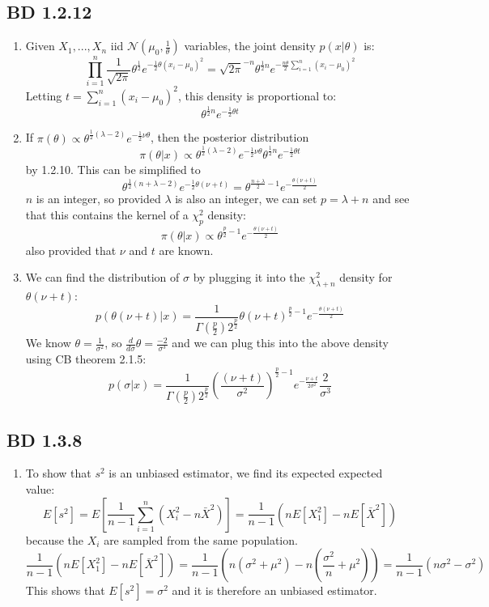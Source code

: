 \documentclass[a4paper,12pt]{article}
\begin{document}
\subsection{BD 1.2.12}
\begin{enumerate}
  \item Given $X_1,...,X_n$ iid $\mathcal{N}(\mu_0,\frac{1}{\theta})$ variables, the joint density $p(x|\theta)$ is:
  $$\prod_{i=1}^n \frac{1}{\sqrt{2\pi}}\theta^{\frac{1}{2}}e^{-\frac{1}{2}\theta(x_i-\mu_0)^2}=\sqrt{2\pi}^{-n} \theta^{\frac{1}{2}n}e^{-\frac{n\theta}{2}\sum_{i=1}^n(x_i-\mu_0)^2}$$
  Letting $t=\sum_{i=1}^n (x_i-\mu_0)^2$, this density is proportional to:$$\theta^{\frac{1}{2}n}e^{-\frac{1}{2}\theta t}$$
  \item If $\pi(\theta)\propto\theta^{\frac{1}{2}(\lambda-2)}e^{-\frac{1}{2}\nu\theta}$, then the posterior distribution $$\pi(\theta|x)\propto\theta^{\frac{1}{2}(\lambda-2)}e^{-\frac{1}{2}\nu\theta} \theta^{\frac{1}{2}n}e^{-\frac{1}{2}\theta t}$$ by 1.2.10. This can be simplified to
  $$\theta^{\frac{1}{2}(n+\lambda-2)}e^{-\frac{1}{2}\theta(\nu+t)}=\theta^{\frac{n+\lambda}{2}-1}e^{-\frac{\theta(\nu+t)}{2}}$$
  $n$ is an integer, so provided $\lambda$ is also an integer, we can set $p=\lambda+n$ and see that this contains the kernel of a $\chi_{p}^2$ density: $$\pi(\theta|x)\propto\theta^{\frac{p}{2}-1}e^{-\frac{\theta(\nu+t)}{2}}$$ also provided that $\nu$ and $t$ are known.
  \item We can find the distribution of $\sigma$ by plugging it into the $\chi_{\lambda+n}^2$ density for $\theta(\nu+t)$:
  $$p(\theta(\nu+t)|x)=\frac{1}{\Gamma(\frac{p}{2})2^{\frac{p}{2}}}\theta(\nu+t)^{\frac{p}{2}-1}e^{-\frac{\theta(\nu+t)}{2}}$$
  We know $\theta=\frac{1}{\sigma^2}$, so $\frac{d}{d\sigma}\theta=\frac{-2}{\sigma^3}$ and we can plug this into the above density using CB theorem 2.1.5:
  $$p(\sigma|x)=\frac{1}{\Gamma(\frac{p}{2})2^{\frac{p}{2}}}(\frac{(\nu+t)}{\sigma^2})^{\frac{p}{2}-1}e^{-\frac{\nu+t}{2\sigma^2}}\frac{2}{\sigma^3}$$
\end{enumerate}
\subsection{BD 1.3.8}
\begin{enumerate}
  \item To show that $s^2$ is an unbiased estimator, we find its expected expected value:$$E[s^2]=E[\frac{1}{n-1}\sum_{i=1}^{n}(X_i^2-n\bar{X}^2)]=\frac{1}{n-1}(nE[X_1^2]-nE[\bar{X}^2])$$ because the $X_i$ are sampled from the same population. $$\frac{1}{n-1}(nE[X_1^2]-nE[\bar{X}^2])=\frac{1}{n-1}(n(\sigma^2+\mu^2)-n(\frac{\sigma^2}{n}+\mu^2))=\frac{1}{n-1}(n\sigma^2-\sigma^2)$$
  This shows that $E[s^2]=\sigma^2$ and it is therefore an unbiased estimator.
\end{enumerate}
\end{document}
